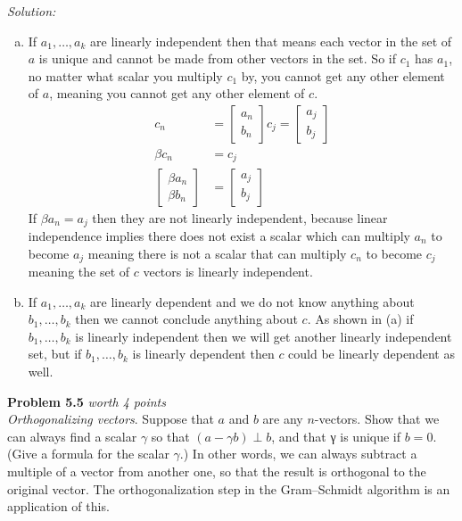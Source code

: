 \documentclass{article}
\newenvironment{problem}[3][Problem]
    { \begin{mdframed}[backgroundcolor=gray!20] \textbf{#1 #2} \textit{worth #3 points} \\}
    {  \end{mdframed}}
\newenvironment{solution}
    {\textit{Solution:}}
    {}
\begin{document}
\begin{solution}
\begin{enumerate}[(a)]
    \item If $a_1, \ldots, a_k$ are linearly independent then that means each vector in the set of $a$ is unique and cannot be made from other vectors in the set. So if $c_1$ has $a_1$, no matter what scalar you multiply $c_1$ by, you cannot get any other element of $a$, meaning you cannot get any other element of $c$.
    \begin{align*}
        c_n &= \begin{bmatrix} a_n\\ b_n \end{bmatrix}  c_j = \begin{bmatrix} a_j\\ b_j \end{bmatrix} \\
        \beta c_n &= c_j \\
        \begin{bmatrix} \beta a_n\\ \beta b_n \end{bmatrix} &= \begin{bmatrix} a_j\\ b_j \end{bmatrix}
    \end{align*}
    If $\beta a_n = a_j$ then they are not linearly independent, because linear independence implies there does not exist a scalar which can multiply $a_n$ to become $a_j$ meaning there is not a scalar that can multiply $c_n$ to become $c_j$ meaning the set of $c$ vectors is linearly independent.
    \item If $a_1, \ldots, a_k$ are linearly dependent and we do not know anything about $b_1,\ldots,b_k$ then we cannot conclude anything about $c$. As shown in (a) if $b_1,\ldots,b_k$ is linearly independent then we will get another linearly independent set, but if $b_1,\ldots,b_k$ is linearly dependent then $c$ could be linearly dependent as well.
\end{enumerate}
\end{solution}
\begin{problem}{5.5}{4}
\textit{Orthogonalizing vectors}. Suppose that $a$ and $b$ are any $n$-vectors. Show that we can always find a scalar $\gamma$ so that $(a-\gamma b) \perp b$, and that γ is unique if $b = 0$. (Give a formula for the scalar $\gamma$.) In other words, we can always subtract a multiple of a vector from another one, so that the result is orthogonal to the original vector. The orthogonalization step in the Gram–Schmidt algorithm is an application of this.
\end{problem}
\end{document}

